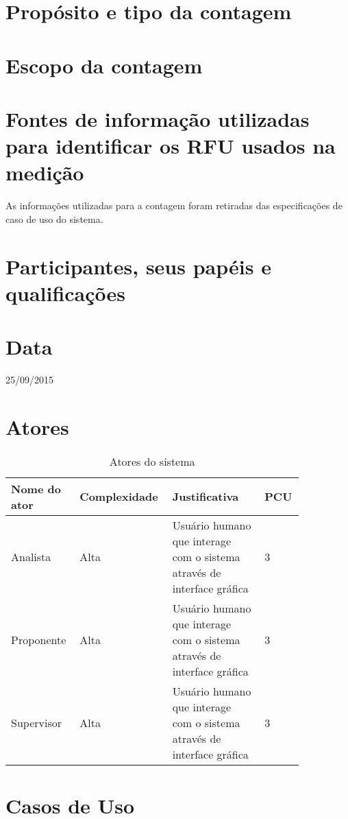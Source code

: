 \section{Propósito e tipo da contagem}

\section{Escopo da contagem}

\section{Fontes de informação utilizadas para identificar os RFU usados na medição}
As informações utilizadas para a contagem foram retiradas das especificações de caso de uso do sistema.

\section{Participantes, seus papéis e qualificações}

\section{Data}
25/09/2015

\section{Atores}

\begin{table*}[!h]
\centering
\caption{Atores do sistema}
\label{Rotulo}
  \begin{tabular}{|p{0.20\linewidth}|p{0.25\linewidth}|p{0.30\linewidth}|p{0.10\linewidth}|}
  \hline
  \textbf{Nome do ator} & \textbf{Complexidade} & \textbf{Justificativa} & \textbf{PCU} \\ 
  \hline

  Analista & Alta & Usuário humano que interage com o sistema através de interface gráfica & 3 \\
  \hline
  Proponente & Alta & Usuário humano que interage com o sistema através de interface gráfica & 3\\
  \hline
  Supervisor & Alta & Usuário humano que interage com o sistema através de interface gráfica & 3\\
  \hline
  \end{tabular}
\end{table*}


\section{Casos de Uso}

